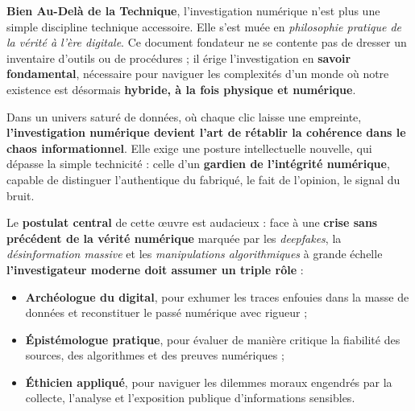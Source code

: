 \documentclass[11pt]{article}
\begin{document}
\newpage

\setlength\headheight{15pt} 





 \textbf{Bien Au-Delà de la Technique}, l'investigation numérique n'est plus une simple discipline technique accessoire. 
Elle s’est muée en \textit{philosophie pratique de la vérité à l’ère digitale}. 
Ce document fondateur ne se contente pas de dresser un inventaire d’outils ou de procédures ; 
il érige l’investigation en \textbf{savoir fondamental}, nécessaire pour naviguer les complexités d’un monde où notre existence est désormais \textbf{hybride, à la fois physique et numérique}.

\vspace{0.5cm}

Dans un univers saturé de données, où chaque clic laisse une empreinte, \textbf{l’investigation numérique devient l’art de rétablir la cohérence dans le chaos informationnel}. 
Elle exige une posture intellectuelle nouvelle, qui dépasse la simple technicité : 
celle d’un \textbf{gardien de l’intégrité numérique}, capable de distinguer l’authentique du fabriqué, le fait de l’opinion, le signal du bruit.

\vspace{0.5cm}

Le \textbf{postulat central} de cette œuvre est audacieux : 
face à une \textbf{crise sans précédent de la vérité numérique} marquée par les \textit{deepfakes}, la \textit{désinformation massive} et les \textit{manipulations algorithmiques} à grande échelle 
\textbf{l’investigateur moderne doit assumer un triple rôle} :

\begin{itemize}
    \item \textbf{Archéologue du digital}, pour exhumer les traces enfouies dans la masse de données et reconstituer le passé numérique avec rigueur ;
    \item \textbf{Épistémologue pratique}, pour évaluer de manière critique la fiabilité des sources, des algorithmes et des preuves numériques ;
    \item \textbf{Éthicien appliqué}, pour naviguer les dilemmes moraux engendrés par la collecte, l’analyse et l’exposition publique d’informations sensibles.
\end{itemize}
\end{document}
